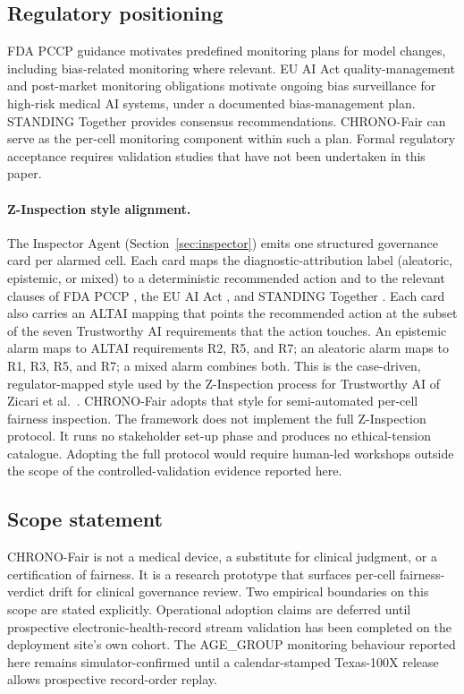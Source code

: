 \documentclass[acmsmall,nonacm,review,anonymous]{acmart}
\newcommand{\1}[1]{\mathbf{1}\!\left\{#1\right\}}
\begin{document}
\subsection{Regulatory positioning}

FDA PCCP guidance \cite{fda2024pccp} motivates predefined monitoring plans for model changes, including bias-related monitoring where relevant. EU AI Act \cite{eu2024aiact} quality-management and post-market monitoring obligations motivate ongoing bias surveillance for high-risk medical AI systems, under a documented bias-management plan. STANDING Together \cite{ricci2025standing} provides consensus recommendations. CHRONO-Fair can serve as the per-cell monitoring component within such a plan. Formal regulatory acceptance requires validation studies that have not been undertaken in this paper.

\paragraph{Z-Inspection style alignment.}
The Inspector Agent (Section~\ref{sec:inspector}) emits one structured governance card per alarmed cell. Each card maps the diagnostic-attribution label (aleatoric, epistemic, or mixed) to a deterministic recommended action and to the relevant clauses of FDA PCCP \cite{fda2024pccp}, the EU AI Act \cite{eu2024aiact}, and STANDING Together \cite{ricci2025standing}. Each card also carries an ALTAI mapping that points the recommended action at the subset of the seven Trustworthy AI requirements \cite{eu2019altai} that the action touches. An epistemic alarm maps to ALTAI requirements R2, R5, and R7; an aleatoric alarm maps to R1, R3, R5, and R7; a mixed alarm combines both. This is the case-driven, regulator-mapped style used by the Z-Inspection process for Trustworthy AI of Zicari et al.\ \cite{zicari2021zinspection}. CHRONO-Fair adopts that style for semi-automated per-cell fairness inspection. The framework does not implement the full Z-Inspection protocol. It runs no stakeholder set-up phase and produces no ethical-tension catalogue. Adopting the full protocol would require human-led workshops outside the scope of the controlled-validation evidence reported here.

\subsection{Scope statement}

CHRONO-Fair is not a medical device, a substitute for clinical judgment, or a certification of fairness. It is a research prototype that surfaces per-cell fairness-verdict drift for clinical governance review. Two empirical boundaries on this scope are stated explicitly. Operational adoption claims are deferred until prospective electronic-health-record stream validation has been completed on the deployment site's own cohort. The AGE\_GROUP monitoring behaviour reported here remains simulator-confirmed until a calendar-stamped Texas-100X release allows prospective record-order replay.
\end{document}
